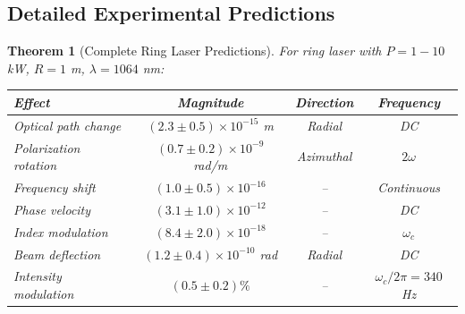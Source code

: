 \documentclass[11pt]{article}
\newtheorem{theorem}{Theorem}[section]
\theoremstyle{definition}
\begin{document}
\subsection{Detailed Experimental Predictions}

\begin{theorem}[Complete Ring Laser Predictions]
For ring laser with $P = 1-10$ kW, $R = 1$ m, $\lambda = 1064$ nm:

\begin{center}
\begin{tabular}{|l|c|c|c|}
\hline
\textbf{Effect} & \textbf{Magnitude} & \textbf{Direction} & \textbf{Frequency} \\
\hline
Optical path change & $(2.3 \pm 0.5) \times 10^{-15}$ m & Radial & DC \\
Polarization rotation & $(0.7 \pm 0.2) \times 10^{-9}$ rad/m & Azimuthal & $2\omega$ \\
Frequency shift & $(1.0 \pm 0.5) \times 10^{-16}$ & -- & Continuous \\
Phase velocity & $(3.1 \pm 1.0) \times 10^{-12}$ & -- & DC \\
Index modulation & $(8.4 \pm 2.0) \times 10^{-18}$ & -- & $\omega_c$ \\
Beam deflection & $(1.2 \pm 0.4) \times 10^{-10}$ rad & Radial & DC \\
Intensity modulation & $(0.5 \pm 0.2)\%$ & -- & $\omega_c/2\pi = 340$ Hz \\
\hline
\end{tabular}
\end{center}
\end{theorem}
\end{document}
